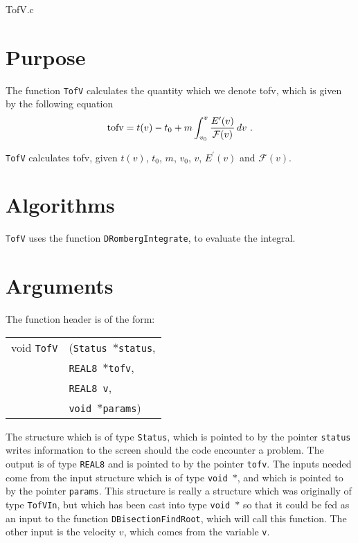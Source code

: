 \documentclass[12pt]{article}
\begin{document}
\huge
\begin{center}
TofV.c
\end{center}
\normalsize
\vspace{10mm}

\section{Purpose}

The function \texttt{TofV} calculates the quantity which we denote tofv, which is given by the following equation
\begin{equation}
\mathrm{tofv} = t(v) - t_{0} + m \int_{v_{0}}^{v} \frac{E'(v)}{{\cal F}(v)} \, dv \,\,.
\label{tofv}
\end{equation}

\texttt{TofV} calculates tofv, given $t(v)$, $t_{0}$, $m$, $v_{0}$, $v$, $E^{\prime}(v)$ and $\mathcal{F}(v)$.




\section{Algorithms}

\texttt{TofV} uses the function \texttt{DRombergIntegrate}, to evaluate the integral.


\section{Arguments}

The function header is of the form:

\vspace{5mm}

\begin{tabular}{ll}
void \texttt{TofV}&(\texttt{Status $\ast$status},     \\
                                   &\texttt{REAL8 $\ast$tofv}, \\
                                   &\texttt{REAL8 v}, \\
                                   &\texttt{void $\ast$params})
\end{tabular}

\vspace{5mm}

The structure which is of type \texttt{Status}, which is pointed to by the pointer \texttt{status} writes information to the screen should the code encounter a problem. The output is of type \texttt{REAL8} and is pointed to by the pointer \texttt{tofv}. The inputs needed come from the input structure which is of type \texttt{void $\ast$}, and which is pointed to by the pointer \texttt{params}. This structure is really a structure which was originally of type \texttt{TofVIn}, but which has been cast into type \texttt{void $\ast$} so that it could be fed as an input to the function \texttt{DBisectionFindRoot}, which will call this function. The other input is the velocity $v$, which comes from the variable \texttt{v}. 
\end{document}
